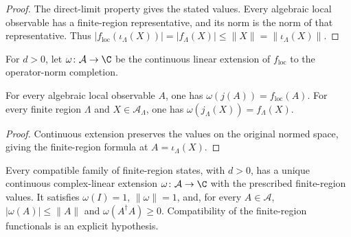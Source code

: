 \begin{proof}
    \leanok
    The direct-limit property gives the stated values. Every algebraic local
    observable has a finite-region representative, and its norm is the norm
    of that representative. Thus
    $|f_{\mathrm{loc}}(\iota_\Lambda(X))|
        =|f_\Lambda(X)|\leq\lVert X\rVert=\lVert\iota_\Lambda(X)\rVert$.
\end{proof}

\begin{definition}
    \label{def:qca_compatible_state_completion}
    \leanok
    For $d>0$, let $\omega\colon\mathcal A\to\C$ be the continuous linear
    extension of $f_{\mathrm{loc}}$ to the operator-norm completion.
\end{definition}

\begin{lemma}
    \label{thm:qca_compatible_state_evaluation}
    \leanok
    For every algebraic local observable $A$, one has
    $\omega(j(A))=f_{\mathrm{loc}}(A)$. For every finite region $\Lambda$ and
    $X\in\mathcal A_\Lambda$, one has $\omega(j_\Lambda(X))=f_\Lambda(X)$.
\end{lemma}

\begin{proof}
    \leanok
    Continuous extension preserves the values on the original normed space,
    giving the finite-region formula at $A=\iota_\Lambda(X)$.
\end{proof}

\begin{lemma}
    \label{thm:qca_compatible_state_extension}
    \leanok
    Every compatible family of finite-region states, with $d>0$, has a unique
    continuous complex-linear extension $\omega\colon\mathcal A\to\C$
    with the prescribed finite-region values. It satisfies
    $\omega(I)=1$, $\lVert\omega\rVert=1$, and, for every $A\in\mathcal A$,
    $|\omega(A)|\leq\lVert A\rVert$ and $\omega(A^\dagger A)\geq0$.
    Compatibility of the finite-region functionals is an explicit hypothesis.
\end{lemma}

